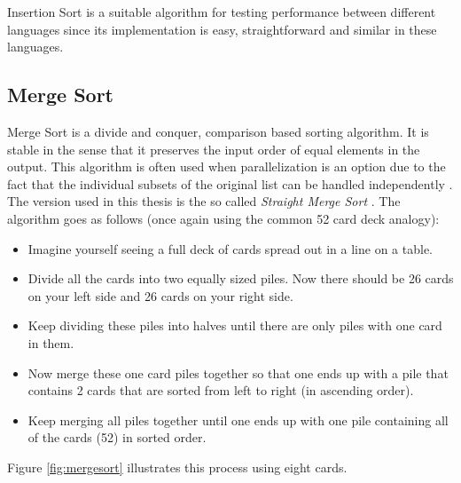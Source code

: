 Insertion Sort is a suitable algorithm for testing performance between different languages since its implementation is easy, straightforward and similar in these languages.


\subsection{Merge Sort} \label{subsec:merge_sort}
Merge Sort is a divide and conquer, comparison based sorting algorithm. It is stable in the sense that it preserves the input order of equal elements in the output. This algorithm is often used when parallelization is an option due to the fact that the individual subsets of the original list can be handled independently \cite{Cole}. The version used in this thesis is the so called \textit{Straight Merge Sort} \cite{Castro}. The algorithm goes as follows (once again using the common 52 card deck analogy):

\begin{itemize}
\item Imagine yourself seeing a full deck of cards spread out in a line on a table.
\item Divide all the cards into two equally sized piles. Now there should be 26 cards on your left side and 26 cards on your right side.
\item Keep dividing these piles into halves until there are only piles with one card in them.
\item Now merge these one card piles together so that one ends up with a pile that contains 2 cards that are sorted from left to right (in ascending order).
\item Keep merging all piles together until one ends up with one pile containing all of the cards (52) in sorted order.

\end{itemize}

Figure \ref{fig:mergesort} illustrates this process using eight cards.

